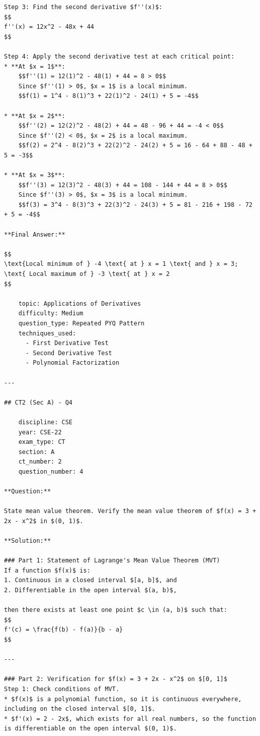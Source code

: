 \documentclass[11pt, a4paper]{article}
\begin{document}
\begin{verbatim}
Step 3: Find the second derivative $f''(x)$:
$$
f''(x) = 12x^2 - 48x + 44
$$

Step 4: Apply the second derivative test at each critical point:
* **At $x = 1$**:
    $$f''(1) = 12(1)^2 - 48(1) + 44 = 8 > 0$$
    Since $f''(1) > 0$, $x = 1$ is a local minimum.
    $$f(1) = 1^4 - 8(1)^3 + 22(1)^2 - 24(1) + 5 = -4$$

* **At $x = 2$**:
    $$f''(2) = 12(2)^2 - 48(2) + 44 = 48 - 96 + 44 = -4 < 0$$
    Since $f''(2) < 0$, $x = 2$ is a local maximum.
    $$f(2) = 2^4 - 8(2)^3 + 22(2)^2 - 24(2) + 5 = 16 - 64 + 88 - 48 + 5 = -3$$

* **At $x = 3$**:
    $$f''(3) = 12(3)^2 - 48(3) + 44 = 108 - 144 + 44 = 8 > 0$$
    Since $f''(3) > 0$, $x = 3$ is a local minimum.
    $$f(3) = 3^4 - 8(3)^3 + 22(3)^2 - 24(3) + 5 = 81 - 216 + 198 - 72 + 5 = -4$$

**Final Answer:**

$$
\text{Local minimum of } -4 \text{ at } x = 1 \text{ and } x = 3; \text{ Local maximum of } -3 \text{ at } x = 2
$$

    topic: Applications of Derivatives
    difficulty: Medium
    question_type: Repeated PYQ Pattern
    techniques_used:
      - First Derivative Test
      - Second Derivative Test
      - Polynomial Factorization

---

## CT2 (Sec A) - Q4

    discipline: CSE
    year: CSE-22
    exam_type: CT
    section: A
    ct_number: 2
    question_number: 4

**Question:**

State mean value theorem. Verify the mean value theorem of $f(x) = 3 + 2x - x^2$ in $(0, 1)$.

**Solution:**

### Part 1: Statement of Lagrange's Mean Value Theorem (MVT)
If a function $f(x)$ is:
1. Continuous in a closed interval $[a, b]$, and
2. Differentiable in the open interval $(a, b)$,

then there exists at least one point $c \in (a, b)$ such that:
$$
f'(c) = \frac{f(b) - f(a)}{b - a}
$$

---

### Part 2: Verification for $f(x) = 3 + 2x - x^2$ on $[0, 1]$
Step 1: Check conditions of MVT.
* $f(x)$ is a polynomial function, so it is continuous everywhere, including on the closed interval $[0, 1]$.
* $f'(x) = 2 - 2x$, which exists for all real numbers, so the function is differentiable on the open interval $(0, 1)$.


\end{verbatim}
\end{document}
